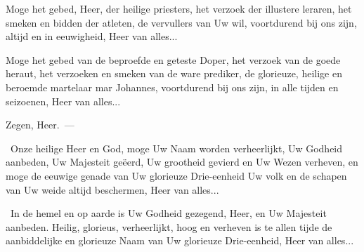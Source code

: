 \documentclass[12pt,twoside,a5paper]{article}
\begin{document}
\begin{halfparskip}
   Moge het gebed, Heer, der heilige priesters, het verzoek der illustere leraren, het smeken en bidden der atleten, de vervullers van Uw wil, voortdurend bij ons zijn, altijd en in eeuwigheid, Heer van alles...

   Moge het gebed van de beproefde en geteste Doper, het verzoek van de goede heraut, het verzoeken en smeken van de ware prediker, de glorieuze, heilige en beroemde martelaar mar Johannes, voortdurend bij ons zijn, in alle tijden en seizoenen, Heer van alles...
\end{halfparskip}




\begin{halfparskip}
  Zegen, Heer.~---  

  \cc~Onze heilige Heer en God, moge Uw Naam worden verheerlijkt, Uw Godheid aanbeden, Uw Majesteit geëerd, Uw grootheid gevierd en Uw Wezen verheven, en moge de eeuwige genade van Uw glorieuze Drie-eenheid Uw volk en de schapen van Uw weide altijd beschermen, Heer van alles...

  \cc~In de hemel en op aarde is Uw Godheid gezegend, Heer, en Uw Majesteit aanbeden. Heilig, glorieus, verheerlijkt, hoog en verheven is te allen tijde de aanbiddelijke en glorieuze Naam van Uw glorieuze Drie-eenheid, Heer van alles...
\end{halfparskip}
\end{document}
